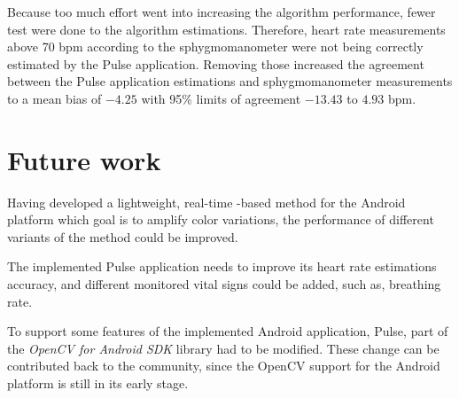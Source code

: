 Because too much effort went into increasing the algorithm performance,
fewer test were done to the algorithm estimations. Therefore, heart rate
measurements above 70 bpm according to the sphygmomanometer were not being
correctly estimated by the Pulse application. Removing those increased the
agreement between the Pulse application estimations and sphygmomanometer
measurements to a mean bias of $-4.25$ with 95\% limits of agreement $-13.43$
to $4.93$ bpm.

\section{Future work} \label{sec:conclusions:future}

Having developed a lightweight, real-time \evm{}-based method for the
Android platform which goal is to amplify color variations, the performance
of different variants of the \evm{} method could be improved.

The implemented Pulse application needs to improve its heart rate estimations
accuracy, and different monitored vital signs could be added, such as,
breathing rate.

To support some features of the implemented Android application, Pulse,
part of the \emph{OpenCV for Android SDK} library had to be modified. These
change can be contributed back to the community, since the OpenCV support
for the Android platform is still in its early stage.
